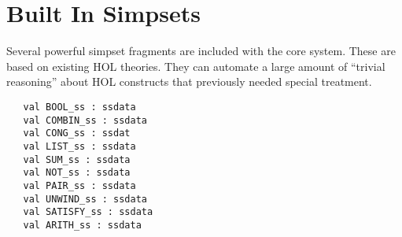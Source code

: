 \section{Built In Simpsets}


Several powerful simpset fragments are included with the core system.
These are based on existing HOL theories.  They can
automate a large amount of ``trivial reasoning'' about
HOL constructs that previously needed special treatment.
\begin{boxed}
\begin{verbatim}
   val BOOL_ss : ssdata
   val COMBIN_ss : ssdata
   val CONG_ss : ssdat
   val LIST_ss : ssdata
   val SUM_ss : ssdata
   val NOT_ss : ssdata
   val PAIR_ss : ssdata
   val UNWIND_ss : ssdata
   val SATISFY_ss : ssdata
   val ARITH_ss : ssdata
\end{verbatim}
\end{boxed}
